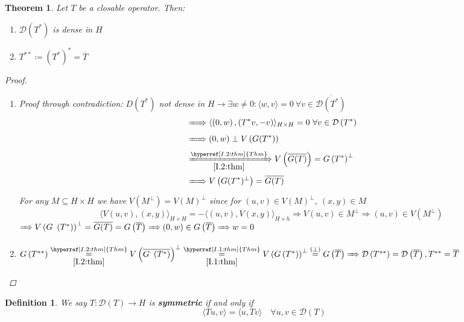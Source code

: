 \documentclass[12pt]{extreport} %
\newcommand{\DO}[1]{\mathcal{D}\left( {#1} \right)}
\theoremstyle{named}
\theoremstyle{nnamed}
\theoremstyle{itshape}
\newtheorem{definition}{Definition}  \counterwithin{definition}{chapter}
\newtheorem{theorem}{Theorem}  \counterwithin{theorem}{chapter}
\theoremstyle{normal}
\begin{document}
\begin{theorem} \label{I.3:thm}
	Let $T$ be a closable operator. Then:
	\begin{enumerate}
		\item $\DO{T^*}$ is dense in $H$
		\item $T^{**} \coloneqq \left( T^* \right)^* = \overline{T}$
	\end{enumerate}
	
	\begin{proof} ~\
		\begin{enumerate}
			\item Proof through contradiction: $D\left( T^* \right)$ not dense in $H \rightarrow \exists w \neq 0: \langle w, v \rangle = 0 ~\forall v \in \overline{\DO{T^*}}$
				\begin{align*}
					& \xRightarrow[]{~~~~} \langle \left( 0, w \right), \left( T^*v, -v \right) \rangle_{H \times H} = 0 ~\forall v \in \DO{T^*} \\
					& \xRightarrow[]{~~~~} \left( 0, w \right) \perp V \left( G(T^*) \right) \\
					& \xRightarrow[\ref{I.2:thm}]{\hyperref[I.2:thm]{Thm}} V \left( \overline{G(T)} \right) = G \left( T^* \right)^{\perp} \\
					& \xRightarrow[]{~~~~} V \left( G(T^*)^{\perp} \right) = \overline{G(T)}
				\end{align*}
				For any $M \subseteq H \times H$ we have $V \left( M^{\perp} \right) = V(M)^{\perp}$ since for $(u,v) \in V(M)^{\perp}$, $(x,y) \in M$
				$$ \langle V(u, v) , (x,y) \rangle_{H \times H} = - \langle (u, v ), V(x,y) \rangle_{H \times h} \Rightarrow V(u, v) \in M^{\perp} \Rightarrow (u, v) \in V\left( M^{\perp} \right) $$
				$\RightArrow V \left( G \left( T^* \right) \right)^{\perp} = \overline{G(T)} = G \left(\overline{T} \right) \RightArrow (0, w) \in G\left( \overline{T} \right) \RightArrow w = 0$
			\item $G \left( T^{**} \right) \overset{\hyperref[I.2:thm]{Thm}}{\underset{\ref{I.2:thm}}{=}} V \left( \overline{G \left( T^* \right)} \right)^{\perp} \overset{\hyperref[I.1:thm]{Thm}}{\underset{\ref{I.1:thm}}{=}} V \left( G \left( T^* \right) \right)^{\perp} \overset{(\perp)}{=} G \left( \overline{T} \right) \RightArrow \DO{T^{**}} = \DO{\overline{T}}, T^{**} = \overline{T}$
		\end{enumerate}
	\end{proof}
\end{theorem}

\begin{definition}
	We say $T \colon \DO{T} \rightarrow H$ is \textbf{symmetric} if and only if
	$$ \langle Tu, v \rangle = \langle u , Tv \rangle \quad \forall u, v \in \DO{T} $$
\end{definition}
\end{document}
